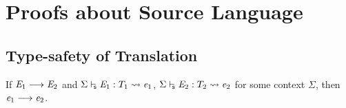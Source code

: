 \section{Proofs about Source Language}
\subsection{Type-safety of Translation}
\begin{lem}\label{lem:appendix:src:redtr}
If $\mathit{E_{{\mathrm{1}}}}  \longrightarrow  \mathit{E_{{\mathrm{2}}}}$ and $ \Sigma  \vdash_{\!\!\mathsf{s} }  \mathit{E_{{\mathrm{1}}}}  :  T_{{\mathrm{1}}}   \rightsquigarrow   \mathit{e_{{\mathrm{1}}}} $, $ \Sigma  \vdash_{\!\!\mathsf{s} }  \mathit{E_{{\mathrm{2}}}}  :  T_{{\mathrm{2}}}   \rightsquigarrow   \mathit{e_{{\mathrm{2}}}} $ for
some context $\Sigma$, then $\mathit{e_{{\mathrm{1}}}}  \longrightarrow  \mathit{e_{{\mathrm{2}}}}$.
\end{lem}

